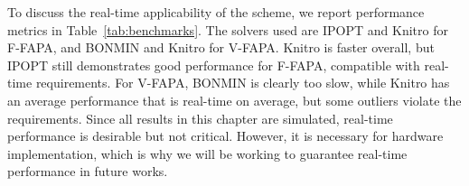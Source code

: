 To discuss the real-time applicability of the scheme, we report performance
metrics in Table~\ref{tab:benchmarks}. The solvers used are IPOPT
and Knitro for F-FAPA, and BONMIN and Knitro for
V-FAPA. Knitro is faster overall, but IPOPT still
demonstrates good performance for F-FAPA, compatible with real-time
requirements. For V-FAPA, BONMIN is clearly too slow, while
Knitro has an average performance that is real-time on average,
but some outliers violate the requirements. Since all results in this chapter
are simulated, real-time performance is desirable but not critical.
However, it is necessary for hardware implementation, which is why we will
be working to guarantee real-time performance in future works.
